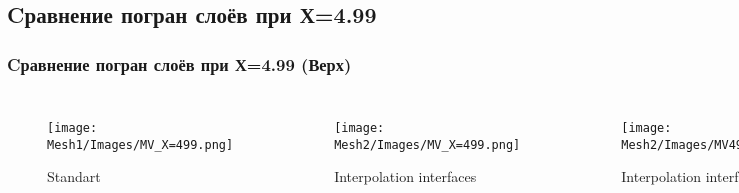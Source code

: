 \documentclass[c, aspectratio = 169]{beamer}
\begin{document}
    \subsection{Cравнение погран слоёв при Х=4.99}
    \begin{frame}
        \frametitle{Cравнение погран слоёв при Х=4.99 (Верх)}
        \begin{columns}[c] 
            
            \vspace{-0.4cm}
            
                \begin{figure}
                    \texttt{[image: Mesh1/Images/MV\_X=499.png]}
                    \caption{Standart}    
                \end{figure}   
        
         
            \vspace{-0.4cm}
            
                \begin{figure}
                    \texttt{[image: Mesh2/Images/MV\_X=499.png]}
                    \caption{Interpolation interfaces}   
                \end{figure}  
    
            \vspace{-0.4cm}
            
                \begin{figure}
                    \texttt{[image: Mesh2/Images/MV499.png]}
                    \caption{Interpolation interfaces}   
                \end{figure}  
        \end{columns}
        \end{frame} 


    
    
\end{document}
